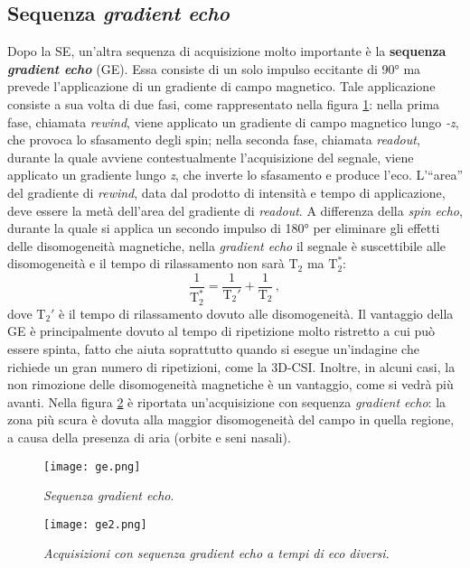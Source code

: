 \documentclass{report}
\newcommand{\virgolette}[1]{``#1''}
\newcommand{\figref}[1]{figura \ref{#1}}
\numberwithin{equation}{section}
\numberwithin{figure}{section}
\begin{document}
\subsection{Sequenza \textit{gradient echo}}
Dopo la SE, un'altra sequenza di acquisizione molto importante è la  \textbf{sequenza \textit{gradient echo}} (GE). Essa consiste di un solo impulso eccitante di 90° ma prevede l'applicazione di un gradiente di campo magnetico. Tale applicazione consiste a sua volta di due fasi, come rappresentato nella \figref{fig:ge}: nella prima fase, chiamata \textit{rewind}, viene applicato un gradiente di campo magnetico lungo \textit{-z}, che provoca lo sfasamento degli spin; nella seconda fase, chiamata \textit{readout}, durante la quale avviene contestualmente l'acquisizione del segnale, viene applicato un gradiente lungo \textit{z}, che inverte lo sfasamento e produce l'eco. L'\virgolette{area} del gradiente di \textit{rewind}, data dal prodotto di intensità e tempo di applicazione, deve essere la metà dell'area del gradiente di \textit{readout}. A differenza della \textit{spin echo}, durante la quale si applica un secondo impulso di 180° per eliminare gli effetti delle disomogeneità magnetiche, nella \textit{gradient echo} il segnale è suscettibile alle disomogeneità e il tempo di rilassamento non sarà $\mathrm{T_2}$ ma $\mathrm{T}_2^*$:
\begin{equation}
    \frac{1}{\mathrm{T}_2^*} = \frac{1}{\mathrm{T}_2'} + \frac{1}{\mathrm{T_2}}\,,
    \label{t2}
\end{equation}
dove $\mathrm{T}_2'$ è il tempo di rilassamento dovuto alle disomogeneità. Il vantaggio della GE è principalmente dovuto al tempo di ripetizione molto ristretto a cui può essere spinta, fatto che aiuta soprattutto quando si esegue un'indagine che richiede un gran numero di ripetizioni, come la 3D-CSI. Inoltre, in alcuni casi, la non rimozione delle disomogeneità magnetiche è un vantaggio, come si vedrà più avanti. Nella \figref{fig:ge2} è riportata un'acquisizione con sequenza \textit{gradient echo}: la zona più scura è dovuta alla maggior disomogeneità del campo in quella regione, a causa della presenza di aria (orbite e seni nasali).

\begin{figure}[htp]
\centering
\texttt{[image: ge.png]}
\caption{\label{fig:ge} \textit{Sequenza gradient echo}.}
\end{figure}

\begin{figure}[htp]
\centering
\texttt{[image: ge2.png]}
\caption{\label{fig:ge2} \textit{Acquisizioni con sequenza gradient echo a tempi di eco diversi}.}
\end{figure}
\end{document}
